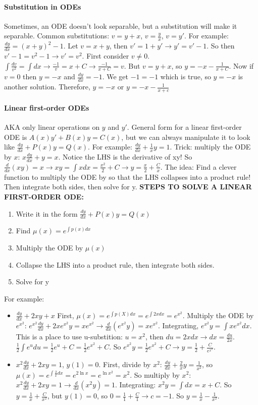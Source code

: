 \documentclass[10pt,letter]{article}
\begin{document}
\paragraph{Substitution in ODEs} Sometimes, an ODE doesn't look separable, but a substitution will make it separable. Common substitutions: $v=y+x$, $v=\frac{y}{x}$, $v=y'$. For example: $\frac{dy}{dx}=(x+y)^2-1$. Let $v=x+y$, then $v'=1+y'\rightarrow y'=v'-1$. So then $v'-1 = v^2-1\rightarrow v' = v^2$. First consider $v\neq 0$. $\int\frac{dv}{v^2}=\int dx\rightarrow \frac{-1}{v}=x+C\rightarrow \frac{-1}{x+C}=v$. But $v=y+x$, so $y=-x-\frac{1}{x+C}$. Now if $v=0$ then $y=-x$ and $\frac{dy}{dx}=-1$. We get $-1 = -1$ which is true, so $y=-x$ is another solution. Therefore, $y=-x$ or $y=-x-\frac{1}{x+c}$

\paragraph{Linear first-order ODEs} AKA only linear operations on $y$ and $y'$. General form for a linear first-order ODE is $A(x)y' + B(x)y = C(x)$, but we can always manipulate it to look like $\frac{dy}{dx}+P(x)y=Q(x)$. For example: $\frac{dy}{dx}+\frac{1}{x}y = 1$. Trick: multiply the ODE by $x$: $x\frac{dy}{dx}+y=x$. Notice the LHS is the derivative of xy! So $\frac{d}{dx}(xy)=x\rightarrow xy=\int xdx = \frac{x^2}{2}+C\rightarrow y=\frac{x}{2}+\frac{C}{x}$. The idea: Find a clever function to multiply the ODE by so that the LHS collapses into a product rule! Then integrate both sides, then solve for y.  \textbf{STEPS TO SOLVE A LINEAR FIRST-ORDER ODE:} \begin{enumerate}
    \item Write it in the form $\frac{dy}{dx}+P(x)y=Q(x)$
    \item Find $\mu(x)=e^{\int p(x)dx}$ 
    \item Multiply the ODE by $\mu(x)$ 
    \item Collapse the LHS into a product rule, then integrate both sides. 
    \item Solve for y
\end{enumerate}
For example: \begin{itemize}
    \item $\frac{dy}{dx}+2xy+x$ First, $\mu(x) = e^{\int p(X)dx} = e^{\int 2xdx} = e^{x^2}$. Multiply the ODE by $e^{x^2}$: $e^{x^2}\frac{dy}{dx}+2xe^{x^2}y = xe^{x^2} \longrightarrow \frac{d}{dx}(e^{x^2}y)=xe^{x^2}$. Integrating, $e^{x^2}y = \int xe^{x^2}dx$. This is a place to use u-substition: $u = x^2$, then $du = 2xdx\longrightarrow dx = \frac{du}{2x}$. $\frac{1}{2}\int e^udu=\frac{1}{2}e^u + C = \frac{1}{2}e^{x^2}+C$. So $e^{x^2}y = \frac{1}{2}e^{x^2}+C\longrightarrow y=\frac{1}{2}+\frac{C}{e^{x^2}}$. 
    \item $x^2\frac{dy}{dx}+2xy=1$, $y(1)=0$. First, divide by $x^2$: $\frac{dy}{dx}+\frac{2}{x}y=\frac{1}{x^2}$, so $\mu(x) = e^{\int\frac{2}{x}dx} = e^{2\ln x}=e^{\ln x^2}=x^2$. So multiply by $x^2$: $x^2\frac{dy}{dx}+2xy=1\longrightarrow \frac{d}{dx}(x^2y)=1$. Integrating: $x^2y=\int dx = x + C$. So $y = \frac{1}{x}+\frac{C}{x^2}$, but $y(1)=0$, so $0=\frac{1}{1}+\frac{C}{1}\longrightarrow c = -1$. So $y=\frac{1}{x}-\frac{1}{x^2}$.  
\end{itemize}
\end{document}
